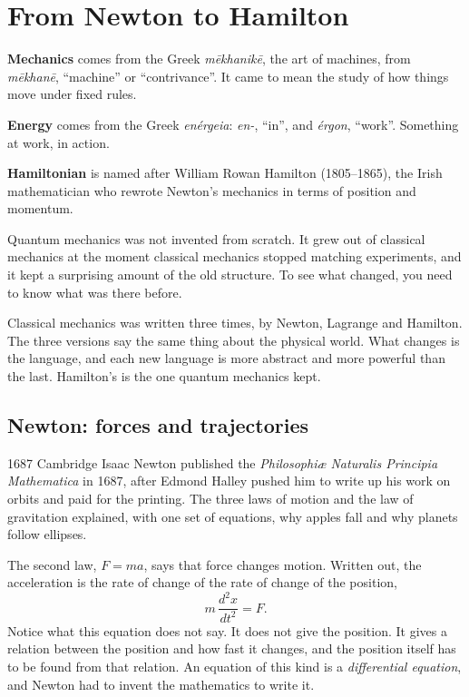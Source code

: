 \chapter{From Newton to Hamilton}\label{ch:classical}

\begin{etymology}
\textbf{Mechanics} comes from the Greek \emph{mēkhanikē}, the art of machines,
from \emph{mēkhanē}, ``machine'' or ``contrivance''. It came to mean the study of
how things move under fixed rules.

\textbf{Energy} comes from the Greek \emph{enérgeia}: \emph{en-}, ``in'', and
\emph{érgon}, ``work''. Something at work, in action.

\textbf{Hamiltonian} is named after William Rowan Hamilton (1805--1865), the Irish
mathematician who rewrote Newton's mechanics in terms of position and momentum.
\end{etymology}

Quantum mechanics was not invented from scratch. It grew out of classical
mechanics at the moment classical mechanics stopped matching experiments, and it
kept a surprising amount of the old structure. To see what changed, you need to
know what was there before.

Classical mechanics was written three times, by Newton, Lagrange and Hamilton.
The three versions say the same thing about the physical world. What changes is
the language, and each new language is more abstract and more powerful than the
last. Hamilton's is the one quantum mechanics kept.

\section{Newton: forces and trajectories}

\begin{history}{1687 \textperiodcentered{} Cambridge}
Isaac Newton published the \emph{Philosophiæ Naturalis Principia Mathematica} in
1687, after Edmond Halley pushed him to write up his work on orbits and paid for
the printing. The three laws of motion and the law of gravitation explained, with
one set of equations, why apples fall and why planets follow ellipses.
\end{history}

The second law, $F = ma$, says that force changes motion. Written out, the
acceleration is the rate of change of the rate of change of the position,
\[
  m\,\frac{d^2x}{dt^2} = F .
\]
Notice what this equation does not say. It does not give the position. It gives a
relation between the position and how fast it changes, and the position itself has to
be found from that relation. An equation of this kind is a \emph{differential
equation}, and Newton had to invent the mathematics to write it.

